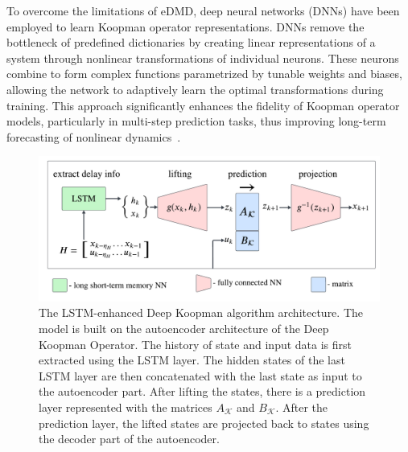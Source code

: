 \documentclass[conference]{IEEEtran}
\begin{document}
To overcome the limitations of eDMD, deep neural networks (DNNs) have been employed to learn Koopman operator representations. DNNs remove the bottleneck of predefined dictionaries by creating linear representations of a system through nonlinear transformations of individual neurons. These neurons combine to form complex functions parametrized by tunable weights and biases, allowing the network to adaptively learn the optimal transformations during training. This approach significantly enhances the fidelity of Koopman operator models, particularly in multi-step prediction tasks, thus improving long-term forecasting of nonlinear dynamics~\cite{Yeung2019}.
\begin{figure}\label{fig:introduction:LSTM-enhanced_deep_koopman_scheme}
    \centerline{\includegraphics[width = \linewidth]{figures/derek_scheme.pdf}}
    \caption{The LSTM-enhanced Deep Koopman algorithm architecture. The model is built on the autoencoder architecture of the Deep Koopman Operator. The history of state and input data is first extracted using the LSTM layer. The hidden states of the last LSTM layer are then concatenated with the last state as input to the autoencoder part. After lifting the states, there is a prediction layer represented with the matrices \(A_\mathcal{K}\) and \(B_\mathcal{K}\). After the prediction layer, the lifted states are projected back to states using the decoder part of the autoencoder.}
\end{figure}
\end{document}
